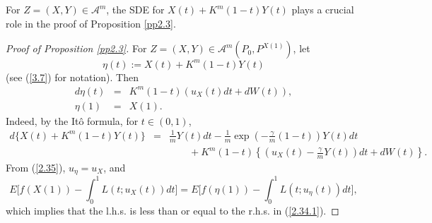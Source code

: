 \documentclass[12pt]{article}
\begin{document}
For $Z=(X,Y)\in \mathcal{A}^m$,
the SDE for $X(t)+K^m(1-t)Y(t)$ plays a crucial role in the proof of Proposition \ref{pp2.3}.

\begin{proof}[Proof of Proposition \ref{pp2.3}]
For $Z=(X,Y)\in \mathcal{A}^m(P_0,P^{X(1)})$, let
\begin{equation}\label{2.34}
\eta(t):=X(t)+K^m(1-t)Y(t)
\end{equation}
(see (\ref{3.7}) for notation).
Then
\begin{eqnarray}
d\eta (t)&=&K^m(1-t)(u_X(t)dt+dW(t)),\label{2.35}\\
\eta(1)&=&X(1).\nonumber
\end{eqnarray}
Indeed, by the It\^o formula, for $t\in (0,1)$,
\begin{eqnarray*}
d\{X(t)+K^m(1-t)Y(t)\}
&=&\frac{1}{m}Y(t)dt-\frac{1}{m}\exp\left(-\frac{\gamma}{m}(1-t)\right)Y(t)dt\\
&&\qquad +K^m(1-t)\left\{\left(u_X(t)-\frac{\gamma }{m}Y(t)\right)dt+dW(t)\right\}.
\end{eqnarray*}
From (\ref{2.35}), $u_\eta =u_X$, and 
\begin{equation}
E\biggl[f(X (1))-\int_0^1 L(t;u_X(t))dt \biggr]
=E\biggl[f(\eta (1))-\int_0^1 L(t;u_\eta(t))dt \biggr],
\end{equation}
which implies that the l.h.s. is less than or equal to the r.h.s. in (\ref{2.34.1}).


\end{proof}
\end{document}
